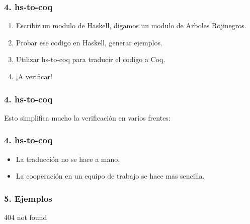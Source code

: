 \documentclass[xcolor=dvipsnames,table,spanish]{beamer}
\begin{document}
\begin{frame}
  \frametitle{4. hs-to-coq}
        \begin{enumerate}
            \item Escribir un modulo de Haskell, digamos un modulo de Arboles Rojinegros.
            \item Probar ese codigo en Haskell, generar ejemplos.
            \item Utilizar hs-to-coq para traducir el codigo a Coq.
            \item ¡A verificar!
        \end{enumerate}
        
\end{frame}

\begin{frame}
  \frametitle{4. hs-to-coq}
        Esto simplifica mucho la verificación en varios frentes:
        
\end{frame}

\begin{frame}
  \frametitle{4. hs-to-coq}
        \begin{itemize}
            \item La traducción no se hace a mano.
            \item La cooperación en un equipo de trabajo se hace mas sencilla.
        \end{itemize}
        
\end{frame}

\begin{frame}
  \frametitle{5. Ejemplos}
       404 not found
        
\end{frame}
\end{document}

